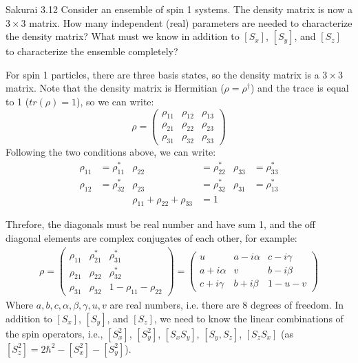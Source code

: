 \documentclass{article}
\begin{document}
\newpage
\begin{section}{Sakurai 3.12}
Consider an ensemble of spin 1 systems. The density matrix is now a $3 \times 3$ matrix. How many independent (real) parameters are needed to characterize the density matrix? What must we know in addition to $[S_x]$, $[S_y]$, and $[S_z]$ to characterize the ensemble completely?

\begin{tcolorbox}
For spin 1 particles, there are three basis states, so the density matrix is a $3 \times 3$ matrix. Note that the density matrix is Hermitian ($\rho = \rho^\dagger$) and the trace is equal to 1 ($tr(\rho) = 1$), so we can write:
$$
	\rho = \begin{pmatrix}
		\rho_{11} & \rho_{12} & \rho_{13} \\
		\rho_{21} & \rho_{22} & \rho_{23} \\
		\rho_{31} & \rho_{32} & \rho_{33}
	\end{pmatrix}
$$
Following the two conditions above, we can write:
\begin{align*}
	\rho_{11} & = \rho_{11}^* & \rho_{22}                         & = \rho_{22}^* & \rho_{33} & = \rho_{33}^* \\
	\rho_{12} & = \rho_{32}^* & \rho_{23}                         & = \rho_{32}^* & \rho_{31} & = \rho_{13}^* \\
	          &               & \rho_{11} + \rho_{22} + \rho_{33} & = 1           &           &               
\end{align*}

Threfore, the diagonals must be real number and have sum 1, and the off diagonal elements are complex conjugates of each other, for example:
\begin{align*}
\rho = \begin{pmatrix}
	\rho_{11} & \rho_{21}^* & \rho_{31}^*               \\
	\rho_{21} & \rho_{22}   & \rho_{32}^*               \\
	\rho_{31} & \rho_{32}   & 1 - \rho_{11} - \rho_{22}
\end{pmatrix}
= \begin{pmatrix}
	u         & a-i\alpha & c-i\gamma \\
	a+i\alpha & v         & b-i\beta  \\
	c+i\gamma & b+i\beta  & 1-u-v
\end{pmatrix}
\end{align*}
Where $a,b,c,\alpha,\beta,\gamma,u,v$ are real numbers, i.e. there are 8 degrees of freedom. In addition to $[S_x]$, $[S_y]$, and $[S_z]$, we need to know the linear combinations of the spin operators, i.e., $[S_x^2]$, $[S_y^2]$, $[S_xS_y]$, $[S_y, S_z]$, $[S_zS_x]$ (as $[S_z^2] = 2\hbar^2 - [S_x^2] - [S_y^2]$).
\end{tcolorbox}
\end{section}
\end{document}
